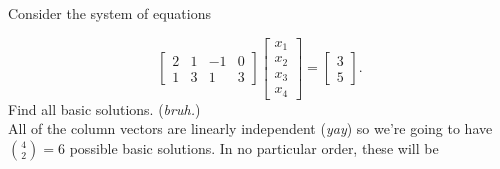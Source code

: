 \documentclass[12pt]{extarticle}
\theoremstyle{definition}
\begin{document}
\begin{problem} Consider the system of equations 

	\[\begin{bmatrix}
	2&1&-1&0\\1&3&1&3
	\end{bmatrix}\begin{bmatrix}
	x_1\\x_2\\x_3\\x_4
	\end{bmatrix}=\begin{bmatrix}
	3\\5
	\end{bmatrix}.\]
	Find all basic solutions. (\textit{bruh.})\\

	All of the column vectors are linearly independent (\textit{yay}) so we're going to have ${{4}\choose{2}} = 6$ possible basic solutions. 
		In no particular order, these will be\\


\end{problem}
\end{document}
